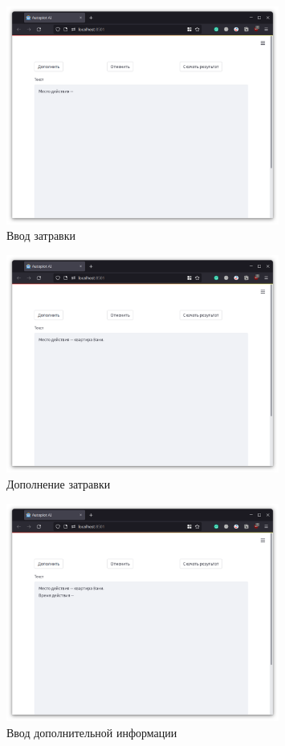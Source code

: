 \begin{figure}[H]
    \centering
    \includegraphics[width=0.8\textwidth]{../inc/images/demo-0.png}
    \caption{Ввод затравки}
    \label{fig:demo-0}
\end{figure}
\begin{figure}[H]
    \centering
    \includegraphics[width=0.8\textwidth]{../inc/images/demo-1.png}
    \caption{Дополнение затравки}
    \label{fig:demo-1}
\end{figure}
\begin{figure}[H]
    \centering
    \includegraphics[width=0.8\textwidth]{../inc/images/demo-2.png}
    \caption{Ввод дополнительной информации}
    \label{fig:demo-2}
\end{figure}
